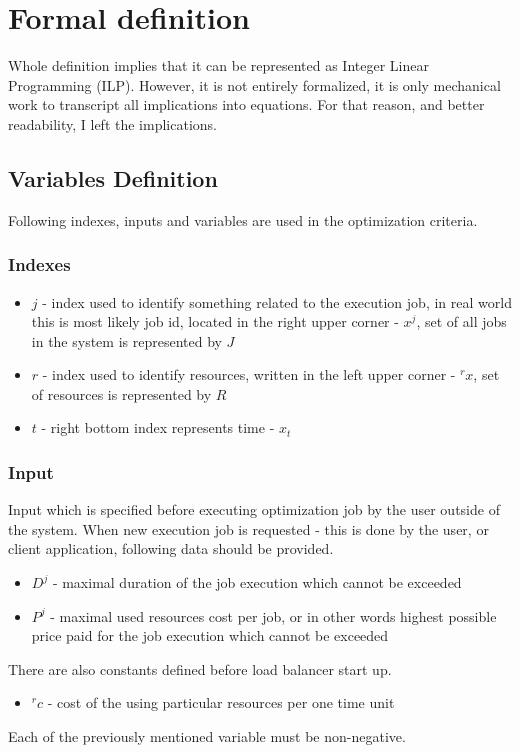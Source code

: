 
\section{Formal definition}\label{sec:formal-definition}
Whole definition implies that it can be represented as Integer Linear Programming (ILP).
However, it is not entirely formalized, 
it is only mechanical work to transcript all implications into equations.
For that reason, and better readability, I left the implications.

\subsection{Variables Definition}\label{subsec:variables-definition}
Following indexes, inputs and variables are used in the optimization criteria.

\subsubsection{Indexes}
\begin{itemize}
	\item $j$ - index used to identify something related to the execution job,
	      in real world this is most likely job id, located in the right upper corner - $x^{j}$, 
	      set of all jobs in the system is represented by $J$
	\item $r$ - index used to identify resources, written in the left upper corner - ${}^{r}x$, set of resources is represented by $R$
	\item $t$ - right bottom index represents time - $x_t$
\end{itemize}

\subsubsection{Input}
Input which is specified before executing optimization job by the user outside of the system.
When new execution job is requested - this is done by the user, or client application,
following data should be provided.
\begin{itemize}
	\item $D^{j}$ - maximal duration of the job execution which cannot be exceeded
	\item $P^{j}$ - maximal used resources cost per job, or in other words highest possible price paid for the job execution which cannot be exceeded
\end{itemize} 
There are also constants defined before load balancer start up.
\begin{itemize}
	\item ${}^{r}c$ - cost of the using particular resources per one time unit
\end{itemize}
Each of the previously mentioned variable must be non-negative.

